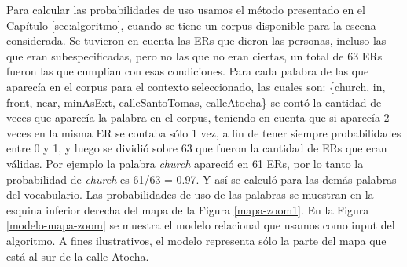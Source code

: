 Para calcular las probabilidades de uso usamos el m\'etodo presentado en el Cap\'itulo \ref{sec:algoritmo}, cuando se tiene un corpus disponible para la escena considerada. Se tuvieron en cuenta las ERs que dieron las personas, incluso las que eran subespecificadas, pero no las que no eran ciertas, un total de 63 ERs fueron las que cumpl\'ian con esas condiciones. Para cada palabra de las que aparec\'ia en el corpus para el contexto seleccionado, las cuales son: \{church, in, front, near, minAsExt, calleSantoTomas, calleAtocha\} se cont\'o la cantidad de veces que aparec\'ia la palabra en el corpus, teniendo en cuenta que si aparec\'ia 2 veces en la misma ER se contaba s\'olo 1 vez, a fin de tener siempre probabilidades entre 0 y 1, y luego se dividi\'o sobre 63 que fueron la cantidad de ERs que eran v\'alidas. Por ejemplo la palabra {\it church} apareci\'o en 61 ERs, por lo tanto la probabilidad de {\it church} es 61/63 = 0.97. Y as\'i se calcul\'o para las dem\'as palabras del vocabulario. Las probabilidades de uso de las palabras se muestran en la esquina inferior derecha del mapa de la Figura \ref{mapa-zoom1}.
En la Figura \ref{modelo-mapa-zoom} se muestra el modelo relacional que usamos como input del algoritmo. A fines ilustrativos, el modelo representa s\'olo la parte del mapa que est\'a al sur de la calle Atocha.

